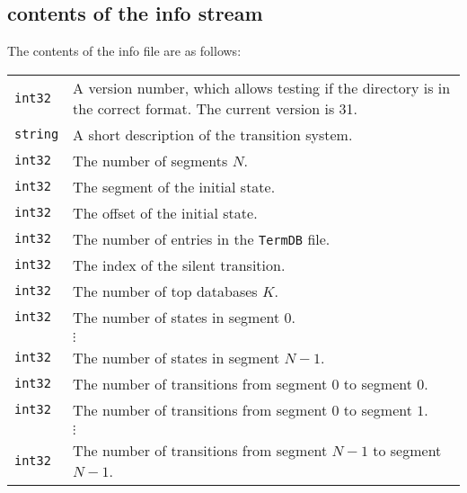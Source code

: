 \subsection{contents of the info stream}
\label{info format}
The contents of the info file are as follows:


\par\noindent\begin{tabularx}{\textwidth}{lX}
{\tt int32} & A version number, which allows testing if the directory is in the correct format.
The current version is 31.
\\
{\tt string} & A short description of the transition system.
\\
{\tt int32} & The number of segments $N$.
\\
{\tt int32} & The segment of the initial state.
\\
{\tt int32} & The offset of the initial state.
\\
{\tt int32} & The number of entries in the {\tt TermDB} file.
\\
{\tt int32} & The index of the silent transition.
\\
{\tt int32} & The number of top databases $K$.
\\
{\tt int32} & The number of states in segment $0$.
\\
&$\vdots$
\\
{\tt int32} & The number of states in segment $N-1$.
\\
{\tt int32} & The number of transitions from segment $0$ to segment $0$.
\\
{\tt int32} & The number of transitions from segment $0$ to segment $1$.
\\
&$\vdots$
\\
{\tt int32} & The number of transitions from segment $N-1$ to segment $N-1$.
\end{tabularx}


